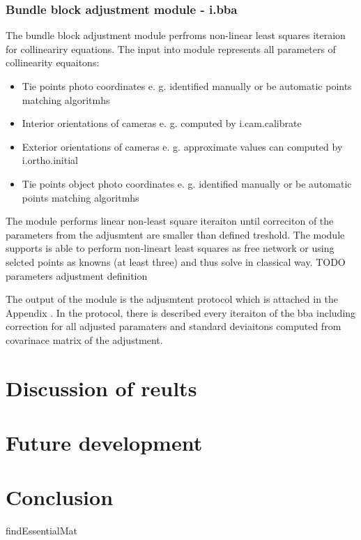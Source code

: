 \documentclass[a4paper,12pt]{report}
\begin{document}
\begin{itemize}
\subsection{Bundle block adjustment module - i.bba}

The bundle block adjustment module perfroms non-linear least squares iteraion for collineariry equations. 
The input into module represents all parameters of collinearity equaitons:
\begin{itemize}
\item Tie points photo coordinates e. g. identified manually or be automatic points matching algoritmhs
\item Interior orientations of cameras e. g. computed by i.cam.calibrate
\item Exterior orientations of cameras e. g. approximate values can computed by i.ortho.initial
\item Tie points object photo coordinates e. g. identified manually or be automatic points matching algoritmhs
\end{itemize}

The module performs linear non-least square iteraiton until correciton of the parameters from the adjusmtent are smaller than
defined treshold. The module supports is able to perform non-lineart least squares as free network or using selcted points 
as knowns (at least three) and thus solve in classical way.
TODO parameters adjustment definition


The output of the module is the adjusmtent protocol which is attached in the Appendix \cite{sec:adj_protocol}. In the protocol, there
is described every iteraiton of the bba including correction for all adjusted paramaters and standard deviaitons computed from 
covarinace matrix of the adjustment. 




\chapter{Discussion of reults}

\chapter{Future development}

\chapter{Conclusion}findEssentialMat


\end{itemize}
\end{document}
